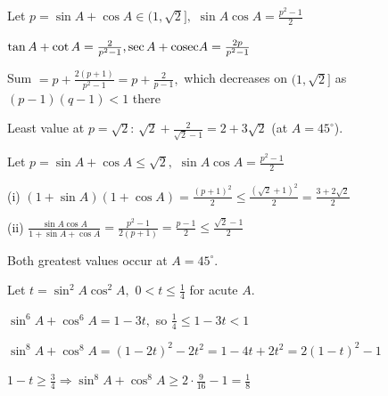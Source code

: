 \item Let $p = \sin A + \cos A \in (1, \sqrt{2}],$ $\sin A\cos A = \frac{p^2 - 1}{2}$

    $\tan A + \cot A = \frac{2}{p^2 - 1}, \sec A + {\rm cosec} A = \frac{2p}{p^2 - 1}$

    Sum $= p + \frac{2(p + 1)}{p^2 - 1} = p + \frac{2}{p - 1},$ which decreases on $(1, \sqrt{2}]$ as $(p - 1)(q - 1) < 1$ there

    Least value at $p = \sqrt{2}$: $\sqrt{2} + \frac{2}{\sqrt{2} - 1} = 2 + 3\sqrt{2}$ (at $A = 45^\circ$).

\item Let $p = \sin A + \cos A \leq \sqrt{2},$ $\sin A\cos A = \frac{p^2 - 1}{2}$

    (i) $(1 + \sin A)(1 + \cos A) = \frac{(p + 1)^2}{2} \leq \frac{(\sqrt{2} + 1)^2}{2} = \frac{3 + 2\sqrt{2}}{2}$

    (ii) $\frac{\sin A\cos A}{1 + \sin A + \cos A} = \frac{p^2 - 1}{2(p + 1)} = \frac{p - 1}{2} \leq \frac{\sqrt{2} - 1}{2}$

    Both greatest values occur at $A = 45^\circ$.

\item Let $t = \sin^2 A\cos^2 A,$ $0 < t \leq \frac{1}{4}$ for acute $A$.

    $\sin^6 A + \cos^6 A = 1 - 3t,$ so $\frac{1}{4} \leq 1 - 3t < 1$

    $\sin^8 A + \cos^8 A = (1 - 2t)^2 - 2t^2 = 1 - 4t + 2t^2 = 2(1 - t)^2 - 1$

    $1 - t \geq \frac{3}{4} \Rightarrow \sin^8 A + \cos^8 A \geq 2\cdot\frac{9}{16} - 1 = \frac{1}{8}$
\stopitemize

